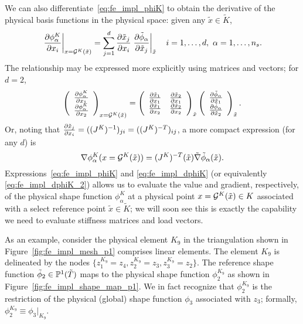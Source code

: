 We can also differentiate~\eqref{eq:fe_impl_phiK} to obtain the derivative of the physical basis functions in the physical space: given any $\tilde x \in \tilde K$, 
\begin{equation}
  \left. \pp{\phi^K_\alpha}{x_i} \right|_{x = \calG^K(\tilde x)} =
  \sum_{j=1}^{d} \pp{\tilde x_j}{x_i} \left. \pp{\tilde \phi_\alpha}{\tilde x_j} \right|_{\tilde x}  \quad i = 1,\dots,d, \ \alpha = 1,\dots,n_s.
  \label{eq:fe_impl_dphiK}
\end{equation}
The relationship may be expressed more explicitly using matrices and vectors; for $d = 2$,
\begin{equation*}
  \bmat{c}
  \pp{\phi_\alpha^K}{x_1} \\ \pp{\phi_\alpha^K}{x_2}
  \emat_{x = \calG^K(\tilde x)}
  =
  \bmat{cc}
  \pp{\tilde x_1}{x_1} & \pp{\tilde x_2}{x_1} \\
  \pp{\tilde x_1}{x_2} & \pp{\tilde x_2}{x_2}
  \emat_{\tilde x}
  \bmat{c}
  \pp{\tilde \phi_\alpha}{\tilde x_1} \\ \pp{\tilde \phi_\alpha}{\tilde x_2}
  \emat_{\tilde x}.
\end{equation*}
Or, noting that $\pp{\tilde x_j}{x_i} = ((J^K)^{-1})_{ji} = ((J^K)^{-T})_{ij}$, a more compact expression (for any $d$) is
\begin{equation}
  \nabla \phi_\alpha^K(x = \calG^K(\tilde x)) = (J^K)^{-T}(\tilde x) \tilde \nabla \tilde \phi_\alpha(\tilde x).
  \label{eq:fe_impl_dphiK_2}
\end{equation}
Expressions~\eqref{eq:fe_impl_phiK} and \eqref{eq:fe_impl_dphiK} (or equivalently \eqref{eq:fe_impl_dphiK_2}) allows us to evaluate the value and gradient, respectively, of the physical shape function $\phi^K_\alpha$ at a physical point $x = \calG^K(\tilde x) \in K$ associated with a select reference point $\tilde x \in \tilde K$; we will soon see this is exactly the capability we need to evaluate stiffness matrices and load vectors.

As an example, consider the physical element $K_9$ in the triangulation shown in Figure~\ref{fig:fe_impl_mesh_p1} comprises linear elements.  The element $K_9$ is delineated by the nodes $\{ z^{K_9}_1 = z_4, z^{K_9}_2 = z_3, z^{K_9}_3 = z_2 \}$. The reference shape function $\tilde \phi_2 \in \PP^1(\tilde T)$ maps to the physical shape function $\phi_2^{K_9}$ as shown in Figure~\ref{fig:fe_impl_shape_map_p1}.  We in fact recognize that $\phi_2^{K_9}$ is the restriction of the physical (global) shape function $\phi_3$ associated with $z_3$; formally, $\phi_2^{K_9} \equiv \phi_3|_{K_9}$. %


